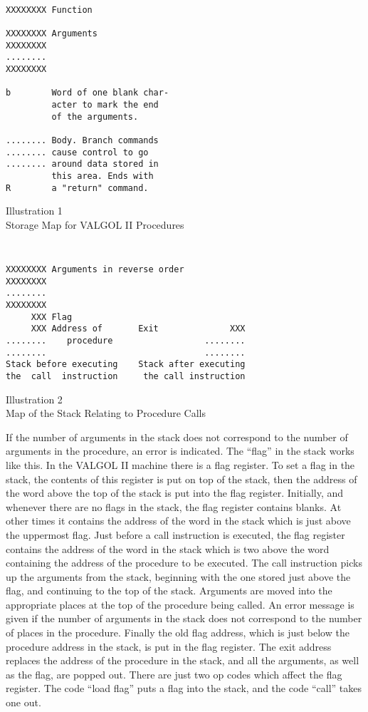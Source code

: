 \documentclass[twocolumn]{article}
\begin{document}
\begin{center}
{\tt
\begin{verbatim}
XXXXXXXX Function

XXXXXXXX Arguments
XXXXXXXX
........
XXXXXXXX

b        Word of one blank char-
         acter to mark the end
         of the arguments.

........ Body. Branch commands
........ cause control to go
........ around data stored in
         this area. Ends with
R        a "return" command.
\end{verbatim}
}
Illustration 1 \\
Storage Map for VALGOL II Procedures
\end{center}

\begin{center}
{\tt
\begin{verbatim}
XXXXXXXX Arguments in reverse order
XXXXXXXX
........
XXXXXXXX
     XXX Flag
     XXX Address of       Exit              XXX
........    procedure                  ........
........                               ........
Stack before executing    Stack after executing
the  call  instruction     the call instruction
\end{verbatim}
}
Illustration 2 \\
Map of the Stack Relating to Procedure Calls
\end{center}

If the number of arguments in the stack does not correspond to the number of
arguments in the procedure, an error is indicated.
The ``flag'' in the stack works like this.
In the VALGOL II machine there is a flag register.
To set a flag in the stack, the contents of this register is put on top of
the stack, then the address of the word above the top of the stack is put into
the flag register.
Initially, and whenever there are no flags in the stack, the flag register
contains blanks.
At other times it contains the address of the word in the stack which is just
above the uppermost flag.
Just before a call instruction is executed, the flag register contains the
address of the word in the stack which is two above the word containing the
address of the procedure to be executed.
The call instruction picks up the arguments from the stack, beginning with
the one stored just above the flag, and continuing to the top of the stack.
Arguments are moved into the appropriate places at the top of the procedure
being called.
An error message is given if the number of arguments in the stack does not
correspond to the number of places in the procedure.
Finally the old flag address, which is just below the procedure address in
the stack, is put in the flag register.
The exit address replaces the address of the procedure in the stack, and all
the arguments, as well as the flag, are popped out.
There are just two op codes which affect the flag register.
The code ``load flag'' puts a flag into the stack, and the code ``call'' takes
one out.
\end{document}
